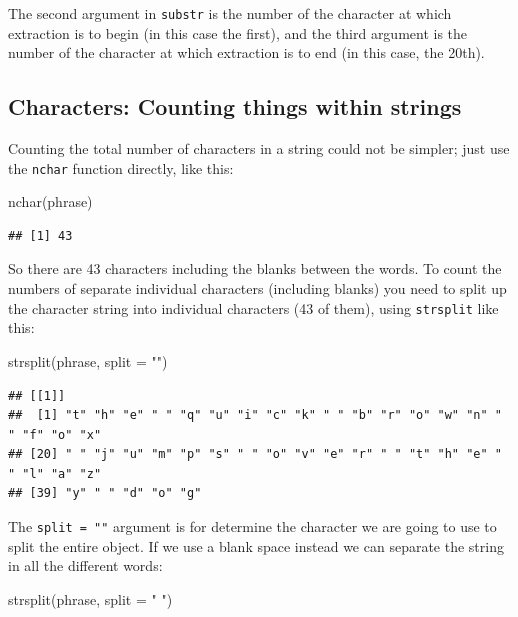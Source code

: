 \documentclass[
]{book}
\newenvironment{Shaded}{\begin{snugshade}}{\end{snugshade}}
\newcommand{\AttributeTok}[1]{\textcolor[rgb]{0.77,0.63,0.00}{#1}}
\newcommand{\FunctionTok}[1]{\textcolor[rgb]{0.00,0.00,0.00}{#1}}
\newcommand{\NormalTok}[1]{#1}
\newcommand{\StringTok}[1]{\textcolor[rgb]{0.31,0.60,0.02}{#1}}
\begin{document}
The second argument in \texttt{substr} is the number of the character at which extraction is to begin (in this case the first), and the third argument is the number of the character at which extraction is to end (in this case, the 20th).

\hypertarget{characters-counting-things-within-strings}{%
\subsection{Characters: Counting things within strings}\label{characters-counting-things-within-strings}}

Counting the total number of characters in a string could not be simpler; just use the \texttt{nchar} function directly, like this:

\begin{Shaded}
\begin{Highlighting}[]
\FunctionTok{nchar}\NormalTok{(phrase)}
\end{Highlighting}
\end{Shaded}

\begin{verbatim}
## [1] 43
\end{verbatim}

So there are 43 characters including the blanks between the words. To count the numbers of separate individual characters (including blanks) you need to split up the character string into individual characters (43 of them), using \texttt{strsplit} like this:

\begin{Shaded}
\begin{Highlighting}[]
\FunctionTok{strsplit}\NormalTok{(phrase, }\AttributeTok{split =} \StringTok{""}\NormalTok{)}
\end{Highlighting}
\end{Shaded}

\begin{verbatim}
## [[1]]
##  [1] "t" "h" "e" " " "q" "u" "i" "c" "k" " " "b" "r" "o" "w" "n" " " "f" "o" "x"
## [20] " " "j" "u" "m" "p" "s" " " "o" "v" "e" "r" " " "t" "h" "e" " " "l" "a" "z"
## [39] "y" " " "d" "o" "g"
\end{verbatim}

The \texttt{split\ =\ ""} argument is for determine the character we are going to use to split the entire object. If we use a blank space instead we can separate the string in all the different words:

\begin{Shaded}
\begin{Highlighting}[]
\FunctionTok{strsplit}\NormalTok{(phrase, }\AttributeTok{split =} \StringTok{" "}\NormalTok{)}
\end{Highlighting}
\end{Shaded}
\end{document}
